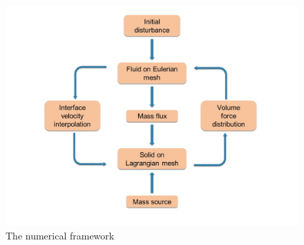 \begin{figure}[H]
   \centering
   \includegraphics[width=.5\textwidth]{./figs/framework.jpg} %
   \caption{The numerical framework}
   \label{fig:framework}
\end{figure}





